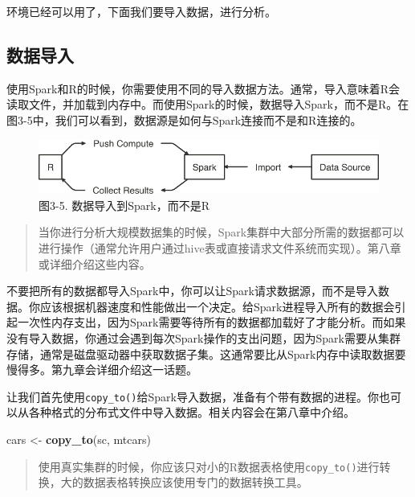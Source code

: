 \documentclass[
]{article}
\newenvironment{Shaded}{\begin{snugshade}}{\end{snugshade}}
\newcommand{\KeywordTok}[1]{\textcolor[rgb]{0.13,0.29,0.53}{\textbf{#1}}}
\newcommand{\NormalTok}[1]{#1}
\newcommand{\StringTok}[1]{\textcolor[rgb]{0.31,0.60,0.02}{#1}}
\begin{document}
环境已经可以用了，下面我们要导入数据，进行分析。

\hypertarget{ux6570ux636eux5bfcux5165}{%
\subsection{数据导入}\label{ux6570ux636eux5bfcux5165}}

使用Spark和R的时候，你需要使用不同的导入数据方法。通常，导入意味着R会读取文件，并加载到内存中。而使用Spark的时候，数据导入Spark，而不是R。在图3-5中，我们可以看到，数据源是如何与Spark连接而不是和R连接的。

\begin{figure}
\centering
\includegraphics{figures/3_5.png}
\caption{图3-5. 数据导入到Spark，而不是R}
\end{figure}

\begin{quote}
当你进行分析大规模数据集的时候，Spark集群中大部分所需的数据都可以进行操作（通常允许用户通过hive表或直接请求文件系统而实现）。第八章或详细介绍这些内容。
\end{quote}

不要把所有的数据都导入Spark中，你可以让Spark请求数据源，而不是导入数据。你应该根据机器速度和性能做出一个决定。给Spark进程导入所有的数据会引起一次性内存支出，因为Spark需要等待所有的数据都加载好了才能分析。而如果没有导入数据，你通过会遇到每次Spark操作的支出问题，因为Spark需要从集群存储，通常是磁盘驱动器中获取数据子集。这通常要比从Spark内存中读取数据要慢得多。第九章会详细介绍这一话题。

让我们首先使用\texttt{copy\_to()}给Spark导入数据，准备有个带有数据的进程。你也可以从各种格式的分布式文件中导入数据。相关内容会在第八章中介绍。

\begin{Shaded}
\begin{Highlighting}[]
\NormalTok{cars <-}\StringTok{ }\KeywordTok{copy_to}\NormalTok{(sc, mtcars)}
\end{Highlighting}
\end{Shaded}

\begin{quote}
使用真实集群的时候，你应该只对小的R数据表格使用\texttt{copy\_to()}进行转换，大的数据表格转换应该使用专门的数据转换工具。
\end{quote}
\end{document}
